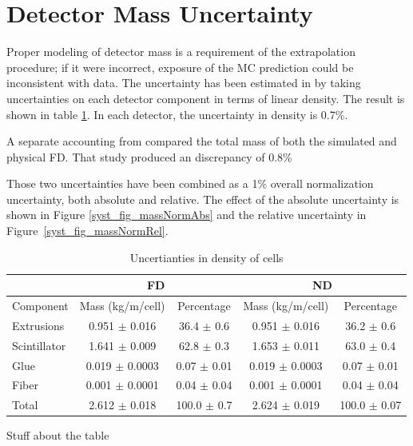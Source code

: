 {\begin{figure}
\end{figure}

\clearpage

\section{Detector Mass Uncertainty}

Proper modeling of detector mass is a requirement of the extrapolation
procedure; if it were incorrect, exposure of the MC prediction could
be inconsistent with data.
The uncertainty has been estimated in \cite{raddatz2016thesis}
by taking uncertainties on each detector component in terms of linear density.
The result is shown in table \ref{detector_density_table}.
In each detector, the uncertainty in density is 0.7\%.

A separate accounting from \cite{musser2014mass} compared
the total mass of both the simulated and physical FD.
That study produced an discrepancy of 0.8\%

Those two uncertainties have been combined as a
1\% overall normalization uncertainty, both absolute and relative.
The effect of the absolute uncertainty is shown in
Figure \ref{syst_fig_massNormAbs} and the relative uncertainty in
Figure~\ref{syst_fig_massNormRel}.


\begin{table}
\begin{center}
\begin{tabular}{|l|c|c|c|c|}
\hline
& \multicolumn{2}{c|}{FD} & \multicolumn{2}{c|}{ND} \\ \hline
Component    & Mass (kg/m/cell)   & Percentage & Mass (kg/m/cell) & Percentage \\ \hline
Extrusions   & 0.951 $\pm$ 0.016  & 36.4 $\pm$ 0.6  &  0.951 $\pm$ 0.016  & 36.2 $\pm$ 0.6 \\
Scintillator & 1.641 $\pm$ 0.009  & 62.8 $\pm$ 0.3  &  1.653 $\pm$ 0.011  & 63.0 $\pm$ 0.4 \\
Glue         & 0.019 $\pm$ 0.0003 & 0.07 $\pm$ 0.01 &  0.019 $\pm$ 0.0003 & 0.07 $\pm$ 0.01 \\
Fiber        & 0.001 $\pm$ 0.0001 & 0.04 $\pm$ 0.04 &  0.001 $\pm$ 0.0001 & 0.04 $\pm$ 0.04 \\ \hline
Total        & 2.612 $\pm$ 0.018  & 100.0 $\pm$ 0.7 &  2.624 $\pm$ 0.019  & 100.0 $\pm$ 0.07 \\ \hline
\end{tabular}
\end{center}
\caption{Uncertianties in density of \nova cells}{
Stuff about the table }
\label{detector_density_table}


\end{table}}
